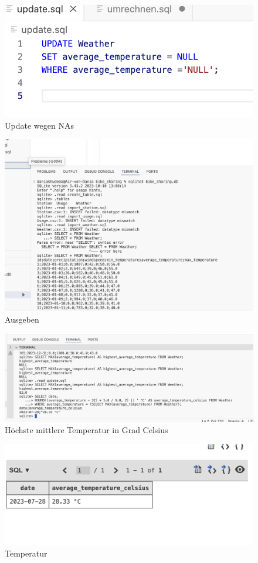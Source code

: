 \documentclass{article}
\begin{document}
\begin{figure} [h]
    \centering
    \includegraphics[width=0.6\linewidth]{update NAs.png}
    \caption{Update wegen NAs}
    \label{fig:enter-label}
\end{figure}

\begin{figure}[h]
    \centering
    \includegraphics[width=0.7\linewidth]{Ausgeben.png}
    \caption{Ausgeben}
    \label{fig:enter-label}
\end{figure}
\begin{figure} [h]
    \centering
    \includegraphics[width=1\linewidth]{Abfrage Temperatur.png}
    \caption{Höchste mittlere Temperatur in Grad Celsius}
    \label{fig:enter-label}
\end{figure}
\begin{figure}
    \centering
    \includegraphics[width=0.5\linewidth]{Abfrage Bild.png}
    \caption{Temperatur}
    \label{fig:enter-label}
\end{figure}
\end{document}
